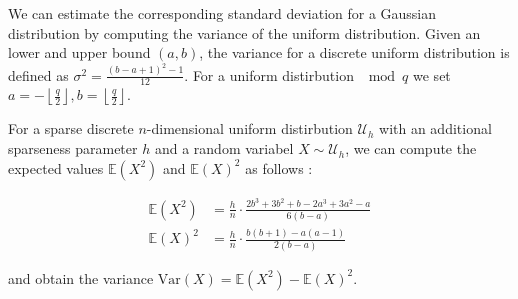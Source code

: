 We can estimate the corresponding standard deviation for a Gaussian distribution by computing the variance of the uniform distribution. Given an lower and upper bound $(a, b)$, the variance for a discrete uniform distribution is defined as $\sigma^2 = \frac{(b - a + 1)^2 - 1}{12}$. For a uniform distirbution $\mod q$ we set $a = -\left\lfloor \frac{q}{2} \right\rfloor, b = \left\lfloor \frac{q}{2} \right\rfloor$.

For a sparse discrete $n$-dimensional uniform distirbution $\mathcal{U}_h$ with an additional sparseness parameter $h$ and a random variabel $X \sim \mathcal{U}_h$, we can compute the expected values $\mathbb{E}(X^2)$ and $\mathbb{E}(X)^2$ as follows \cite{APS15}:

\begin{align}
    \mathbb{E}(X^2) & = \frac{h}{n} \cdot \frac{2b^3 + 3b^2 + b - 2a^3 + 3a^2 - a}{6(b - a)} \\
    \mathbb{E}(X)^2 & = \frac{h}{n} \cdot \frac{b (b + 1) - a(a - 1)}{2(b - a)}
\end{align}

and obtain the variance $\text{Var}(X) = \mathbb{E}(X^2) - \mathbb{E}(X)^2$.



